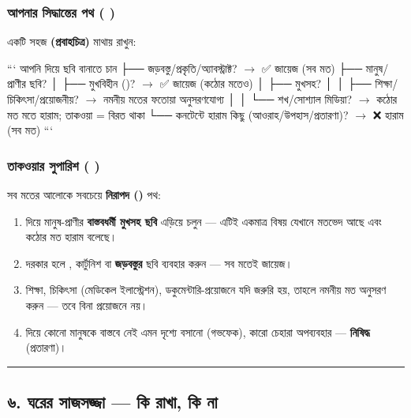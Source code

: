 \subsubsection*{আপনার সিদ্ধান্তের পথ ( )}

একটি সহজ \textbf{ (প্রবাহচিত্র)} মাথায় রাখুন:

```
আপনি  দিয়ে ছবি বানাতে চান
├── জড়বস্তু/প্রকৃতি/অ্যাবস্ট্রাক্ট? $\rightarrow$ ✅ জায়েজ (সব মত)
├── মানুষ/প্রাণীর ছবি?
│   ├── মুখবিহীন ()? $\rightarrow$ ✅ জায়েজ (কঠোর মতেও)
│   ├── মুখসহ?
│   │   ├── শিক্ষা/চিকিৎসা/প্রয়োজনীয়? $\rightarrow$  নমনীয় মতের ফতোয়া অনুসরণযোগ্য
│   │   └── শখ/সোশ্যাল মিডিয়া? $\rightarrow$  কঠোর মত মতে হারাম; তাকওয়া = বিরত থাকা
└── কনটেন্টে হারাম কিছু (আওরাহ/উপহাস/প্রতারণা)? $\rightarrow$ ❌ হারাম (সব মত)
```

\subsubsection*{তাকওয়ার সুপারিশ ( )}

সব মতের আলোকে সবচেয়ে \textbf{নিরাপদ ()} পথ:

\begin{enumerate}
\item {} দিয়ে মানুষ-প্রাণীর \textbf{বাস্তবধর্মী মুখসহ ছবি} এড়িয়ে চলুন — এটিই একমাত্র বিষয় যেখানে মতভেদ আছে এবং কঠোর মত হারাম বলেছে।
\item দরকার হলে \textbf{}, কার্টুনিশ বা \textbf{জড়বস্তুর} ছবি ব্যবহার করুন — সব মতেই জায়েজ।
\item শিক্ষা, চিকিৎসা (মেডিকেল ইলাস্ট্রেশন), ডকুমেন্টারি-প্রয়োজনে যদি জরুরি হয়, তাহলে নমনীয় মত অনুসরণ করুন — তবে বিনা প্রয়োজনে নয়।
\item {} দিয়ে কোনো মানুষকে বাস্তবে নেই এমন দৃশ্যে বসানো (গভফেক), কারো চেহারা অপব্যবহার — \textbf{নিষিদ্ধ} (প্রতারণা)।
\end{enumerate}
\medskip\hrule\medskip

\subsection*{৬. ঘরের সাজসজ্জা — কি রাখা, কি না}

